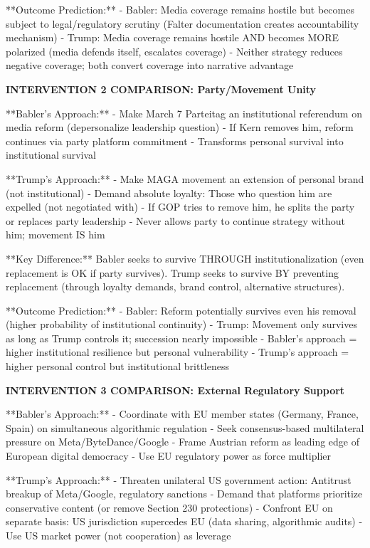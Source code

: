 **Outcome Prediction:**
- Babler: Media coverage remains hostile but becomes subject to legal/regulatory scrutiny (Falter documentation
  creates accountability mechanism)
- Trump: Media coverage remains hostile AND becomes MORE polarized (media defends itself, escalates coverage)
- Neither strategy reduces negative coverage; both convert coverage into narrative advantage

\vspace{0.5cm}

\textbf{INTERVENTION 2 COMPARISON: Party/Movement Unity}

**Babler's Approach:**
- Make March 7 Parteitag an institutional referendum on media reform (depersonalize leadership question)
- If Kern removes him, reform continues via party platform commitment
- Transforms personal survival into institutional survival

**Trump's Approach:**
- Make MAGA movement an extension of personal brand (not institutional)
- Demand absolute loyalty: Those who question him are expelled (not negotiated with)
- If GOP tries to remove him, he splits the party or replaces party leadership
- Never allows party to continue strategy without him; movement IS him

**Key Difference:** Babler seeks to survive THROUGH institutionalization (even replacement is OK if party survives).
Trump seeks to survive BY preventing replacement (through loyalty demands, brand control, alternative structures).

**Outcome Prediction:**
- Babler: Reform potentially survives even his removal (higher probability of institutional continuity)
- Trump: Movement only survives as long as Trump controls it; succession nearly impossible
- Babler's approach = higher institutional resilience but personal vulnerability
- Trump's approach = higher personal control but institutional brittleness

\vspace{0.5cm}

\textbf{INTERVENTION 3 COMPARISON: External Regulatory Support}

**Babler's Approach:**
- Coordinate with EU member states (Germany, France, Spain) on simultaneous algorithmic regulation
- Seek consensus-based multilateral pressure on Meta/ByteDance/Google
- Frame Austrian reform as leading edge of European digital democracy
- Use EU regulatory power as force multiplier

**Trump's Approach:**
- Threaten unilateral US government action: Antitrust breakup of Meta/Google, regulatory sanctions
- Demand that platforms prioritize conservative content (or remove Section 230 protections)
- Confront EU on separate basis: US jurisdiction supercedes EU (data sharing, algorithmic audits)
- Use US market power (not cooperation) as leverage

